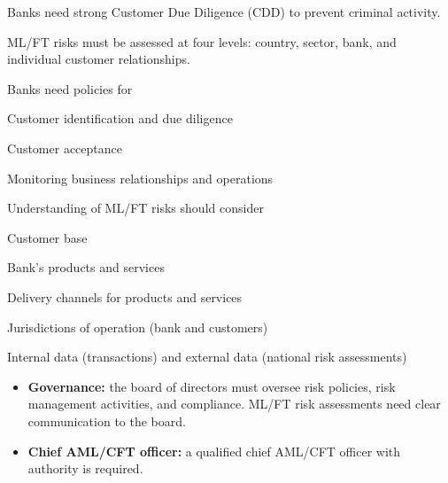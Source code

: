 



\begin{checks}
\item Banks need strong Customer Due Diligence (CDD) to prevent criminal
activity.
\item ML/FT risks must be assessed at four levels: country, sector, bank, and
individual customer relationships.
\item Banks need policies for
  \begin{lettered}
  \item Customer identification and due diligence
  \item Customer acceptance
  \item Monitoring business relationships and operations
  \end{lettered}
\item Understanding of ML/FT risks should consider
  \begin{lettered}
  \item Customer base
  \item Bank's products and services
  \item Delivery channels for products and services
  \item Jurisdictions of operation (bank and customers)
  \item Internal data (transactions) and external data (national risk
  assessments)
  \end{lettered}
\end{checks}


\begin{itemize}
\item \textbf{Governance:} the board of directors must oversee risk policies,
risk management activities, and compliance. ML/FT risk assessments need clear
communication to the board.
\item \textbf{Chief AML/CFT officer:} a qualified chief AML/CFT officer with
authority is required.
\end{itemize}

